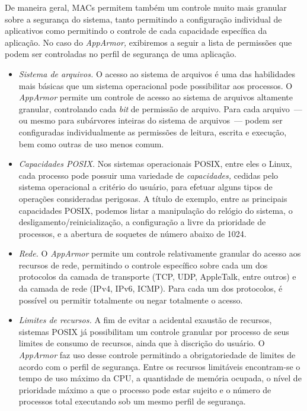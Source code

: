 \documentclass[ruledheader, 12pt]{abnt}
\begin{document}
De maneira geral, MACs permitem também um controle muito mais granular sobre a segurança do sistema, tanto permitindo a configuração individual de aplicativos como permitindo o controle de cada capacidade específica da aplicação. No caso do \emph{AppArmor,} exibiremos a seguir a lista de permissões que podem ser controladas no perfil de segurança de uma aplicação.
\begin{itemize}
	\item \emph{Sistema de arquivos.} O acesso ao sistema de arquivos é uma das habilidades mais básicas que um sistema operacional pode possibilitar aos processos. O \emph{AppArmor} permite um controle de acesso ao sistema de arquivos altamente granular, controlando cada \emph{bit} de permissão de arquivo. Para cada arquivo~--- ou mesmo para subárvores inteiras do sistema de arquivos~--- podem ser configuradas individualmente as permissões de leitura, escrita e execução, bem como outras de uso menos comum.
	
	
	\item \emph{Capacidades POSIX.} Nos sistemas operacionais POSIX, entre eles o Linux, cada processo pode possuir uma variedade de \emph{capacidades,} cedidas pelo sistema operacional a critério do usuário, para efetuar alguns tipos de operações consideradas perigosas. A título de exemplo, entre as principais capacidades POSIX, podemos listar a manipulação do relógio do sistema, o desligamento/reinicialização, a configuração a livre da prioridade de processos, e a abertura de soquetes de número abaixo de 1024.
	
	\item \emph{Rede.} O \emph{AppArmor} permite um controle relativamente granular do acesso aos recursos de rede, permitindo o controle específico sobre cada um dos protocolos da camada de transporte (TCP, UDP, AppleTalk, entre outros) e da camada de rede (IPv4, IPv6, ICMP). Para cada um dos protocolos, é possível ou permitir totalmente ou negar totalmente o acesso.
	
	\item \emph{Limites de recursos.} A fim de evitar a acidental exaustão de recursos, sistemas POSIX já possibilitam um controle granular por processo de seus limites de consumo de recursos, ainda que à discrição do usuário. O \emph{AppArmor} faz uso desse controle permitindo a obrigatoriedade de limites de acordo com o perfil de segurança. Entre os recursos limitáveis encontram-se o tempo de uso máximo da CPU, a quantidade de memória ocupada, o nível de prioridade máximo a que o processo pode estar sujeito e o número de processos total executando sob um mesmo perfil de segurança.
\end{itemize}
\end{document}
